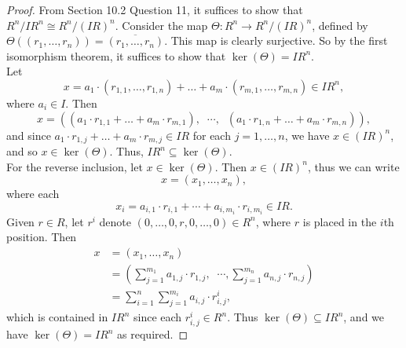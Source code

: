 \documentclass{article}
\begin{document}
  \begin{proof}
    From Section 10.2 Question 11, it suffices to show that $R^n/IR^n
    \cong R^n/(IR)^n$. Consider the map $\Theta:R^n\rightarrow R^n/(IR)^n$,
    defined by $\Theta((r_1,\ldots,r_n)) =\overline{(r_1,\ldots,r_n)}$.
    This map is clearly surjective. So by the first isomorphism theorem, it
    suffices to show that $\ker(\Theta)=IR^n$. \\
    
    Let
    \[x=a_1\cdot(r_{1,1},\ldots,r_{1,n}) +\ldots
    +a_m\cdot(r_{m,1},\ldots,r_{m,n}) \in IR^n,\]
    where $a_i\in I$. Then
    \[x=((a_1\cdot r_{1,1}+\ldots+a_m\cdot r_{m,1}),\;\; \cdots,\;\;
    (a_1\cdot r_{1,n}+\ldots+a_m\cdot r_{m,n})),\]
    and since $a_1\cdot r_{1,j}+\ldots+a_m\cdot r_{m,j}\in IR$ for each
    $j=1,\ldots,n$, we have $x\in (IR)^n$, and so $x\in\ker(\Theta)$. Thus,
    $IR^n\subseteq\ker(\Theta)$. \\

    For the reverse inclusion, let $x\in\ker(\Theta)$. Then $x\in(IR)^n$,
    thus we can write
    \[x =(x_1,\ldots,x_n),\]
    where each
    \[x_i=a_{i,1}\cdot r_{i,1} + \cdots + a_{i,m_i}\cdot r_{i,m_i} \in
    IR.\]
    Given $r\in R$, let $r^i$ denote $(0,\ldots,0,r,0,\ldots,0)\in R^n$,
    where $r$ is placed in the $i$th position. Then 
    \begin{align*}
      x &=(x_1,\ldots,x_n) \\
      &=(\sum_{j=1}^{m_1}a_{1,j}\cdot r_{1,j},\;\; \cdots,
        \sum_{j=1}^{m_n}a_{n,j}\cdot r_{n,j}) \\
      &=\sum_{i=1}^n\sum_{j=1}^{m_i} a_{i,j}\cdot r^i_{i,j},
    \end{align*}
    which is contained in $IR^n$ since each $r^i_{i,j}\in R^n$. Thus
    $\ker(\Theta)\subseteq IR^n$, and we have $\ker(\Theta)=IR^n$ as
    required.
  \end{proof}
\end{document}
